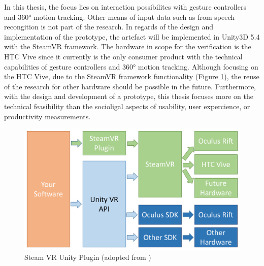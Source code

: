 In this thesis, the focus lies on interaction possibilites with gesture controllers and 360° motion tracking. Other means of input data such as from speech recongition is not part of the research.
In regards of the design and implementation of the prototype, the artefact will be implemented in Unity3D 5.4 with the SteamVR framework. The hardware in scope for the verification is the HTC Vive since it currently is the only consumer product with the  technical capabilities of gesture controllers and 360° motion tracking. Although focusing on the HTC Vive, due to the SteamVR framework functionality (Figure \ref{fig:steamvr}), the reuse of the research for other hardware should be possible in the future. \newline
Furthermore, with the design and development of a prototype, this thesis focuses more on the technical feasibility than the socioligal aspects of usability, user expercience, or productivity measurements. 
\begin{figure}[h]
	\begin{center}
		\includegraphics[width=14cm]{03_Figures/04_Valve/OpenVR_SteamVR.png}
		\caption[Steam VR Unity Plugin]{Steam VR Unity Plugin (adopted from \cite{Valve2016})}
		\label{fig:steamvr}
	\end{center}
\end{figure}






